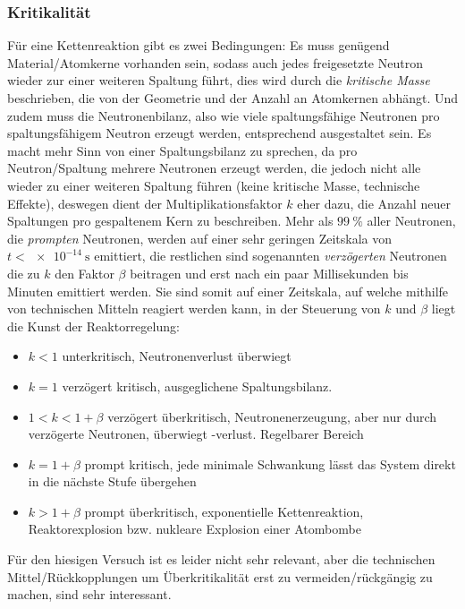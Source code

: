 \subsubsection[Kritikalität]{Kritikalität\autocite{Kritikalität,hiroshima}}
Für eine Kettenreaktion gibt es zwei Bedingungen: Es muss genügend Material/Atomkerne vorhanden sein, sodass auch jedes freigesetzte Neutron wieder zur einer weiteren Spaltung führt, dies wird durch die \emph{kritische Masse} beschrieben, die von der Geometrie und der Anzahl an Atomkernen abhängt. Und zudem muss die Neutronenbilanz, also wie viele spaltungsfähige Neutronen pro spaltungsfähigem Neutron erzeugt werden, entsprechend ausgestaltet sein. Es macht mehr Sinn von einer Spaltungsbilanz zu sprechen, da pro Neutron/Spaltung mehrere Neutronen erzeugt werden, die jedoch nicht alle wieder zu einer weiteren Spaltung führen (keine kritische Masse, technische Effekte), deswegen dient der Multiplikationsfaktor \(k\) eher dazu, die Anzahl neuer Spaltungen pro gespaltenem Kern zu beschreiben. Mehr als \(\qty{99}{\percent}\) aller Neutronen, die \emph{prompten} Neutronen, werden auf einer sehr geringen Zeitskala von \(t<\qty{e-14}{\s}\) emittiert, die restlichen sind sogenannten \emph{verzögerten} Neutronen die zu \(k\) den Faktor \(\beta\) beitragen und erst nach ein paar Millisekunden bis Minuten emittiert werden. Sie sind somit auf einer Zeitskala, auf welche mithilfe von technischen Mitteln reagiert werden kann, in der Steuerung von \(k\) und \(\beta\) liegt die Kunst der Reaktorregelung:  
\begin{itemize}
    \item \(k<1\) unterkritisch, Neutronenverlust überwiegt
    \item \(k=1\) verzögert kritisch, ausgeglichene Spaltungsbilanz. 
    \item \(1<k<1+\beta\) verzögert überkritisch, Neutronenerzeugung, aber nur durch verzögerte Neutronen, überwiegt -verlust. Regelbarer Bereich
    \item \(k=1+\beta\) prompt kritisch, jede minimale Schwankung lässt das System direkt in die nächste Stufe übergehen
    \item \(k>1+\beta\) prompt überkritisch, exponentielle Kettenreaktion, Reaktorexplosion bzw. nukleare Explosion einer Atombombe
\end{itemize}
Für den hiesigen Versuch ist es leider nicht sehr relevant, aber die technischen Mittel/Rückkopplungen um Überkritikalität erst zu vermeiden/rückgängig zu machen, sind sehr interessant. 

